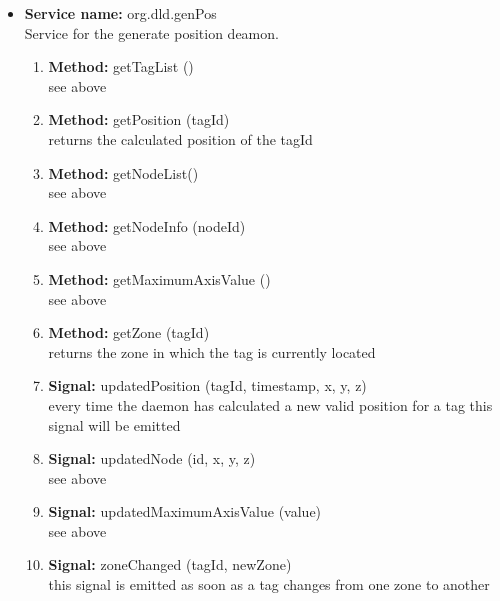 \begin{itemize}
    \item \textbf{Service name:} org.dld.genPos\\
     Service for the generate position deamon.
     \begin{enumerate}
      \item \textbf{Method:} getTagList ()\\
       see above
      \item \textbf{Method:} getPosition (tagId)\\
       returns the calculated position of the tagId
      \item \textbf{Method:} getNodeList()\\
       see above
      \item \textbf{Method:} getNodeInfo (nodeId)\\
       see above
      \item \textbf{Method:} getMaximumAxisValue ()\\
       see above
      \item \textbf{Method:} getZone (tagId)\\
       returns the zone in which the tag is currently located
      \item \textbf{Signal:} updatedPosition (tagId, timestamp, x, y, z)\\
       every time the daemon has calculated a new valid position for a tag this signal will be emitted
      \item \textbf{Signal:} updatedNode (id, x, y, z)\\
       see above
      \item \textbf{Signal:} updatedMaximumAxisValue (value)\\
       see above
      \item \textbf{Signal:} zoneChanged (tagId, newZone)\\
       this signal is emitted as soon as a tag changes from one zone to another
     \end{enumerate}
   \end{itemize}
